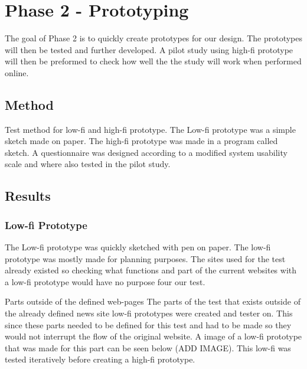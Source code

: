 
\chapter{Phase 2 - Prototyping} %

\label{Chapter5} %

The goal of Phase 2 is to quickly create prototypes for our design. The prototypes will then be tested and further developed. A pilot study using high-fi prototype will then be preformed to check how well the the study will work when performed online.

\section{Method}
Test method for low-fi and high-fi prototype. The Low-fi prototype was a simple sketch made on paper. The high-fi prototype was made in a program called sketch. A questionnaire was designed according to a modified system usability scale and where also tested in the pilot study. 


\section{Results}
\subsection{Low-fi Prototype}
The Low-fi prototype was quickly sketched with pen on paper. The low-fi prototype was mostly made for planning purposes. The sites used for the test already existed so checking what functions and part of the current websites with a low-fi prototype would have no purpose four our test.

Parts outside of the defined web-pages
The parts of the test that exists outside of the already defined news site low-fi prototypes were created and tester on. This since these parts needed to be defined for this test and had to be made so they would not interrupt the flow of the original website. A image of a low-fi prototype that was made for this part can be seen below (ADD IMAGE). This low-fi was tested iteratively before creating a high-fi prototype. 


